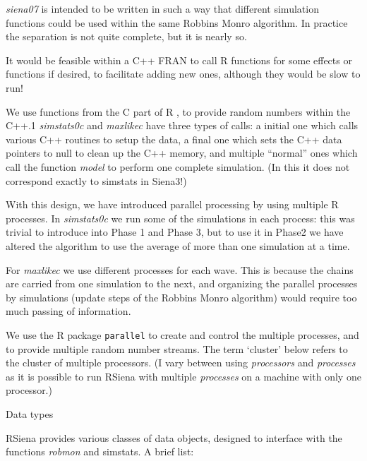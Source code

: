 \documentclass[12pt,a4paper]{article}
\makeatletter
\renewcommand{\=}{\,=\,}
\newcommand{\+}{\,+\,}
\newcommand{\nm}[1]{\textsf{ #1}}
\newcommand{\nnm}[1]{\textsf{\textit{#1}}}
\renewcommand{\section}{\@startsection{section}{1}
                {0pt}{\baselineskip}{0.5\baselineskip}
                {\centering\sffamily} }
\newcommand{\R}{{\sf R }}
\newcommand{\RS}{{\sf RSiena }}
\makeatother
\begin{document}
\nnm{siena07} is intended to be written in such a way that different simulation
functions could be used within the same Robbins Monro algorithm. In practice the
separation is not quite complete, but it is nearly so.

It would be feasible within a C++ \nm{FRAN} to call \R functions for some
effects or functions if desired, to facilitate adding new ones, although they
would be slow to run!

We use functions from the C part of \R, to provide random numbers within the
C++.1 \nnm{simstats0c} and \nnm{maxlikec} have three types of calls: a initial
one which calls various C++ routines to setup the data, a final one which sets
the C++ data pointers to null to clean up the C++ memory, and multiple
``normal'' ones which call the function \nnm{model} to perform one complete
simulation. (In this it does not correspond exactly to \nm{simstats} in Siena3!)

With this design, we have introduced parallel processing by using multiple \R
processes. In \nnm{simstats0c} we run some of the simulations in each process:
this was trivial to introduce into Phase 1 and Phase 3, but to use it in Phase2
we have altered the algorithm to use the average of more than one simulation at
a time.

For \nnm{maxlikec} we use different processes for each wave.
This is because the chains are carried from one simulation to the next,
and organizing the parallel processes by simulations (update steps of the Robbins
Monro algorithm) would require too much passing of information.

We use the
\R package \verb|parallel| to create and control the multiple processes, and
to provide multiple random number streams.  The term
`cluster' below refers to the cluster of multiple processors. (I vary between
using \emph{processors} and \emph{processes} as it is possible to run \RS with
multiple \emph{processes} on a machine with only one processor.)


\section{Data types}

\RS provides various classes of data objects, designed to interface with the
functions \nnm{robmon} and \nm{simstats}. A brief list:
\end{document}
